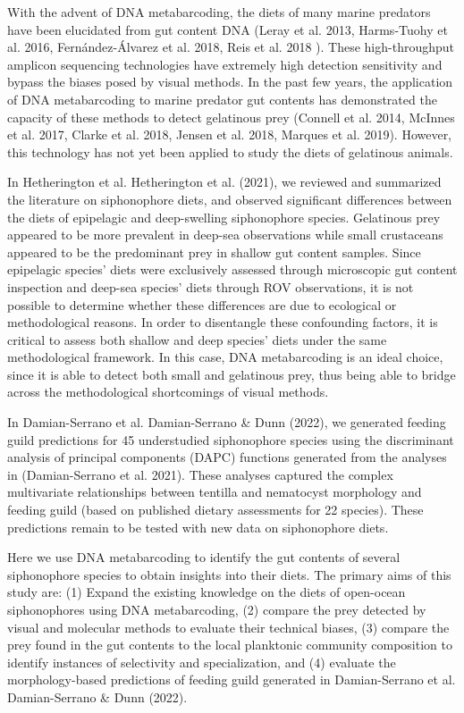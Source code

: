 \documentclass[12pt,]{article}
\begin{document}
With the advent of DNA metabarcoding, the diets of many marine predators have been elucidated from gut content DNA (Leray et al. 2013, Harms-Tuohy et al. 2016, Fernández-Álvarez et al. 2018, Reis et al. 2018 ). These high-throughput amplicon sequencing technologies have extremely high detection sensitivity and bypass the biases posed by visual methods. In the past few years, the application of DNA metabarcoding to marine predator gut contents has demonstrated the capacity of these methods to detect gelatinous prey (Connell et al. 2014, McInnes et al. 2017, Clarke et al. 2018, Jensen et al. 2018, Marques et al. 2019). However, this technology has not yet been applied to study the diets of gelatinous animals.

In Hetherington et al. Hetherington et al. (2021), we reviewed and summarized the literature on siphonophore diets, and observed significant differences between the diets of epipelagic and deep-swelling siphonophore species. Gelatinous prey appeared to be more prevalent in deep-sea observations while small crustaceans appeared to be the predominant prey in shallow gut content samples. Since epipelagic species' diets were exclusively assessed through microscopic gut content inspection and deep-sea species' diets through ROV observations, it is not possible to determine whether these differences are due to ecological or methodological reasons. In order to disentangle these confounding factors, it is critical to assess both shallow and deep species' diets under the same methodological framework. In this case, DNA metabarcoding is an ideal choice, since it is able to detect both small and gelatinous prey, thus being able to bridge across the methodological shortcomings of visual methods.

In Damian-Serrano et al. Damian-Serrano \& Dunn (2022), we generated feeding guild predictions for 45 understudied siphonophore species using the discriminant analysis of principal components (DAPC) functions generated from the analyses in (Damian-Serrano et al. 2021). These analyses captured the complex multivariate relationships between tentilla and nematocyst morphology and feeding guild (based on published dietary assessments for 22 species). These predictions remain to be tested with new data on siphonophore diets.

Here we use DNA metabarcoding to identify the gut contents of several siphonophore species to obtain insights into their diets. The primary aims of this study are: (1) Expand the existing knowledge on the diets of open-ocean siphonophores using DNA metabarcoding, (2) compare the prey detected by visual and molecular methods to evaluate their technical biases, (3) compare the prey found in the gut contents to the local planktonic community composition to identify instances of selectivity and specialization, and (4) evaluate the morphology-based predictions of feeding guild generated in Damian-Serrano et al. Damian-Serrano \& Dunn (2022).
\end{document}
